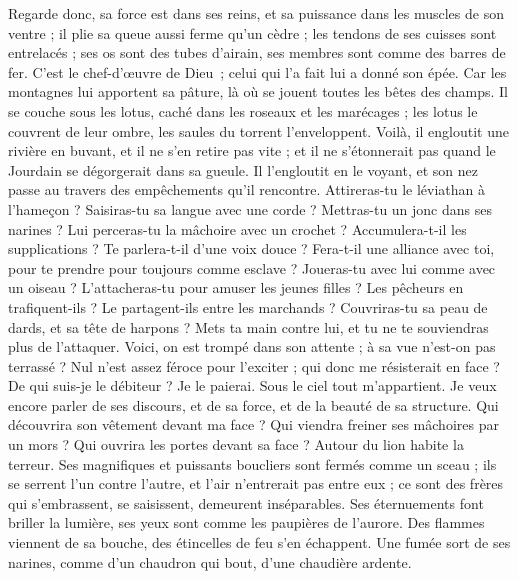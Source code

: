 \begin{multicols}{2}
Regarde donc, sa force est dans ses reins, et sa puissance dans les muscles de son ventre ;
il plie sa queue aussi ferme qu'un cèdre ; les tendons de ses cuisses sont entrelacés ;
ses os sont des tubes d'airain, ses membres sont comme des barres de fer.
C’est le chef-d’œuvre de Dieu ; celui qui l’a fait lui a donné son épée.
Car les montagnes lui apportent sa pâture, là où se jouent toutes les bêtes des champs.
Il se couche sous les lotus, caché dans les roseaux et les marécages ;
les lotus le couvrent de leur ombre, les saules du torrent l'enveloppent.
Voilà, il engloutit une rivière en buvant, et il ne s'en retire pas vite ; et il ne s'étonnerait pas quand le Jourdain se dégorgerait dans sa gueule. 
Il l'engloutit en le voyant, et son nez passe au travers des empêchements qu'il rencontre.  
Attireras-tu le léviathan à l'hameçon ? Saisiras-tu sa langue avec une corde ?
Mettras-tu un jonc dans ses narines ? Lui perceras-tu la mâchoire avec un crochet ?
Accumulera-t-il les supplications ? Te parlera-t-il d'une voix douce ?
Fera-t-il une alliance avec toi, pour te prendre pour toujours comme esclave ?
Joueras-tu avec lui comme avec un oiseau ? L'attacheras-tu pour amuser les jeunes filles ?
Les pêcheurs en trafiquent-ils ? Le partagent-ils entre les marchands ?
Couvriras-tu sa peau de dards, et sa tête de harpons ?
Mets ta main contre lui, et tu ne te souviendras plus de l'attaquer.
Voici, on est trompé dans son attente ; à sa vue n'est-on pas terrassé ?
\VerseOne{}Nul n'est assez féroce pour l'exciter ; qui donc me résisterait en face ?
De qui suis-je le débiteur ? Je le paierai. Sous le ciel tout m'appartient.
Je veux encore parler de ses discours, et de sa force, et de la beauté de sa structure.
Qui découvrira son vêtement devant ma face ? Qui viendra freiner ses mâchoires par un mors ?
Qui ouvrira les portes devant sa face ? Autour du lion habite la terreur.
Ses magnifiques et puissants boucliers sont fermés comme un sceau ;
ils se serrent l'un contre l'autre, et l'air n'entrerait pas entre eux ;
ce sont des frères qui s'embrassent, se saisissent, demeurent inséparables.
Ses éternuements font briller la lumière, ses yeux sont comme les paupières de l'aurore.
Des flammes viennent de sa bouche, des étincelles de feu s'en échappent.
Une fumée sort de ses narines, comme d'un chaudron qui bout, d'une chaudière ardente.

\end{multicols}
